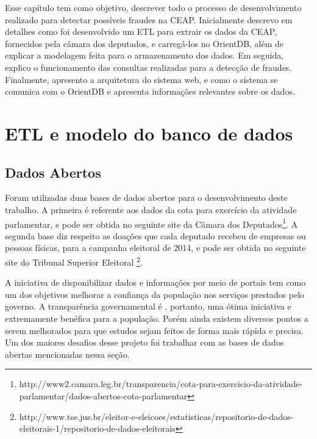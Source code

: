 	Esse capítulo tem como objetivo, descrever todo o processo de desenvolvimento realizado para detectar possíveis fraudes na CEAP. Inicialmente descrevo em detalhes como foi desenvolvido um ETL para extrair os dados da CEAP, fornecidos pela câmara dos deputados, e carregá-los no OrientDB, além de explicar a modelagem feita para o armazenamento dos dados. Em seguida, explico o funcionamento das consultas realizadas para a detecção de fraudes. Finalmente, apresento a arquitetura do sistema web, e como o sistema se comunica com o OrientDB e apresenta informações relevantes sobre os dados.

\section{ETL e modelo do banco de dados}

\subsection{Dados Abertos}

Foram utilizadas duas bases de dados abertos para o desenvolvimento deste trabalho. A primeira é referente aos dados da cota para exercício da atividade parlamentar, e pode ser obtida no seguinte site da Câmara dos Deputados\footnote{http://www2.camara.leg.br/transparencia/cota-para-exercicio-da-atividade-parlamentar/dados-abertos-cota-parlamentar}. A segunda base diz respeito as doações que cada deputado recebeu de empresas ou pessoas físicas, para a campanha eleitoral de 2014, e pode ser obtida no seguinte site do Tribunal Superior Eleitoral \footnote{http://www.tse.jus.br/eleitor-e-eleicoes/estatisticas/repositorio-de-dados-eleitorais-1/repositorio-de-dados-eleitorais}.

A iniciativa de disponibilizar dados e informações por meio de portais tem como um dos objetivos melhorar a confiança da população nos serviços prestados pelo governo. A transparência governamental é , portanto, uma ótima iniciativa e extremamente benéfica para a população. Porém ainda existem diversos pontos a serem melhorados para que estudos sejam feitos de forma mais rápida e precisa. Um dos maiores desafios desse projeto foi trabalhar com as bases de dados abertas mencionadas nessa seção.

